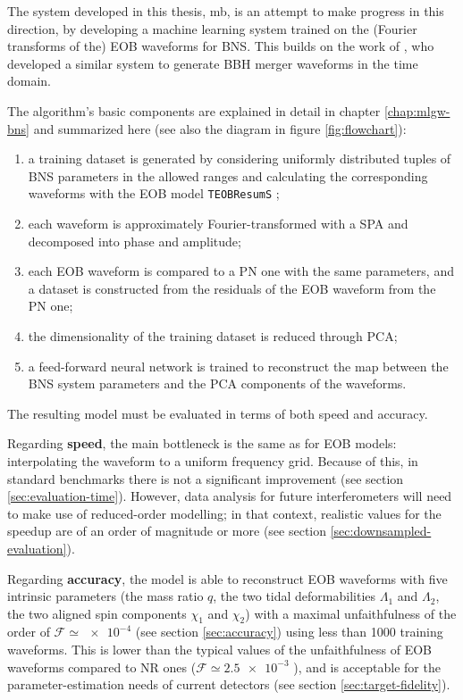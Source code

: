 \documentclass[main.tex]{subfiles}
\begin{document}
The system developed in this thesis, \ac{mb}, is an attempt to make progress in this direction, by developing a machine learning system trained on the (Fourier transforms of the) \ac{EOB} waveforms for \ac{BNS}. 
This builds on the work of \textcite{schmidtMachineLearningGravitational2020}, who developed a similar system to generate \ac{BBH} merger waveforms in the time domain.

The algorithm's basic components are explained in detail in chapter \ref{chap:mlgw-bns} and summarized here (see also the diagram in figure \ref{fig:flowchart}):
\begin{enumerate}
    \item a training dataset is generated by considering uniformly distributed tuples of \ac{BNS} parameters in the allowed ranges and calculating the corresponding waveforms with the \ac{EOB} model \texttt{TEOBResumS} \cite[]{nagarTimedomainEffectiveonebodyGravitational2018};
    \item each waveform is approximately Fourier-transformed with a \ac{SPA} \cite[]{gambaFastFaithfulFrequencydomain2020} and decomposed into phase and amplitude;
    \item each \ac{EOB} waveform is compared to a \ac{PN} one with the same parameters, and a dataset is constructed from the residuals of the \ac{EOB} waveform from the \ac{PN} one;
    \item the dimensionality of the training dataset is reduced through \ac{PCA};
    \item a feed-forward neural network is trained to reconstruct the map between the \ac{BNS} system parameters and the \ac{PCA} components of the waveforms. 
\end{enumerate}

The resulting model must be evaluated in terms of both speed and accuracy.

Regarding \textbf{speed}, the main bottleneck is the same as for \ac{EOB} models: interpolating the waveform to a uniform frequency grid. 
Because of this, in standard benchmarks there is not a significant improvement (see section \ref{sec:evaluation-time}). 
However, data analysis for future interferometers will need to make use of reduced-order modelling; in that context, realistic values for the  speedup are of an order of magnitude or more (see section \ref{sec:downsampled-evaluation}). 

Regarding \textbf{accuracy}, the model is able to reconstruct \ac{EOB} waveforms with five intrinsic parameters (the mass ratio \(q\), the two tidal deformabilities \(\Lambda_1\) and \(\Lambda_2 \), the two aligned spin components \(\chi_1 \) and \(\chi_2 \)) with a maximal unfaithfulness of the order of \(\mathcal{F} \simeq \num{e-4}\) (see section \ref{sec:accuracy}) using less than 1000 training waveforms.
This is lower than the typical values of the unfaithfulness of EOB waveforms compared to \ac{NR} ones (\(\mathcal{F} \simeq \num{2.5e-3}\) \cite{nagarTimedomainEffectiveonebodyGravitational2018}), and is acceptable for the parameter-estimation needs of current detectors (see section \ref{sec:target-fidelity}).
\end{document}
